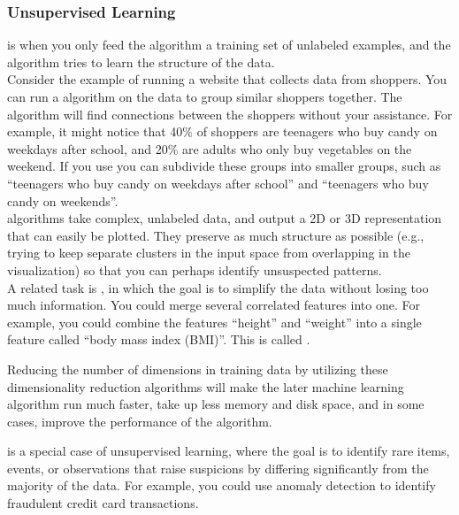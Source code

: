 \subsubsection{Unsupervised Learning}
\label{subsubsec:unsupervised_learning}

 is when you only feed the algorithm a training set of unlabeled examples, and the algorithm tries to learn the structure of the data. \\

Consider the example of running a website that collects data from shoppers. You can run a  algorithm on the data to group similar shoppers together. The algorithm will find connections between the shoppers without your assistance. For example, it might notice that 40\% of shoppers are teenagers who buy candy on weekdays after school, and 20\% are adults who only buy vegetables on the weekend. If you use  you can subdivide these groups into smaller groups, such as ``teenagers who buy candy on weekdays after school'' and ``teenagers who buy candy on weekends''. \\

 algorithms take complex, unlabeled data, and output a 2D or 3D representation that can easily be plotted. They preserve as much structure as possible (e.g., trying to keep separate clusters in the input space from overlapping in the visualization) so that you can perhaps identify unsuspected patterns. \\

A related task is , in which the goal is to simplify the data without losing too much information. You could merge several correlated features into one. For example, you could combine the features ``height'' and ``weight'' into a single feature called ``body mass index (BMI)''. This is called .

\begin{tipbox}
    Reducing the number of dimensions in training data by utilizing these dimensionality reduction algorithms will make the later machine learning algorithm run much faster, take up less memory and disk space, and in some cases, improve the performance of the algorithm.
\end{tipbox}

 is a special case of unsupervised learning, where the goal is to identify rare items, events, or observations that raise suspicions by differing significantly from the majority of the data. For example, you could use anomaly detection to identify fraudulent credit card transactions. \\

